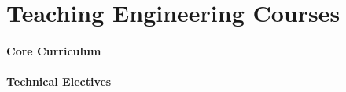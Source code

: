 \documentclass[12pt]{article}
\begin{document}

\section*{Teaching %
Engineering Courses}


\paragraph{Core Curriculum}




\paragraph{Technical Electives} 
\end{document}
